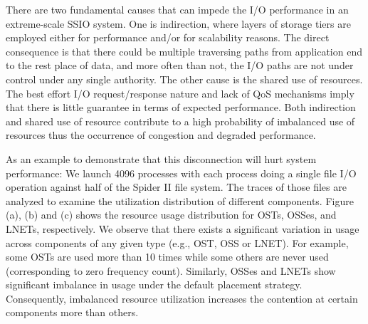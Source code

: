 There are two fundamental causes that can impede the I/O performance
in an extreme-scale SSIO system. One is indirection, where layers
of storage tiers are employed either for performance and/or for
scalability reasons.  The direct consequence is that there could
be multiple traversing paths from application end to the rest place
of data, and more often than not, the I/O paths are not under control
under any single authority. The other cause is the shared use of
resources. The best effort I/O request/response nature and lack of
QoS mechanisms imply that there is little guarantee in terms of
expected performance. Both indirection and shared use of resource
contribute to a high probability of imbalanced use of resources
thus the occurrence of congestion and degraded performance.

As an example to demonstrate that this disconnection will hurt
system performance: We launch 4096 processes with each process doing
a single file I/O operation against half of the Spider II file
system. The traces of those files are analyzed to examine the
utilization distribution of different components. Figure (a), (b)
and (c) shows the resource usage distribution for OSTs, OSSes, and
LNETs, respectively. We observe that there exists a significant
variation in usage across components of any given type (e.g., OST,
OSS or LNET). For example, some OSTs are used more than 10 times
while some others are never used (corresponding to zero frequency
count). Similarly, OSSes and LNETs show significant imbalance in
usage under the default placement strategy. Consequently, imbalanced
resource utilization increases the contention at certain components
more than others.



